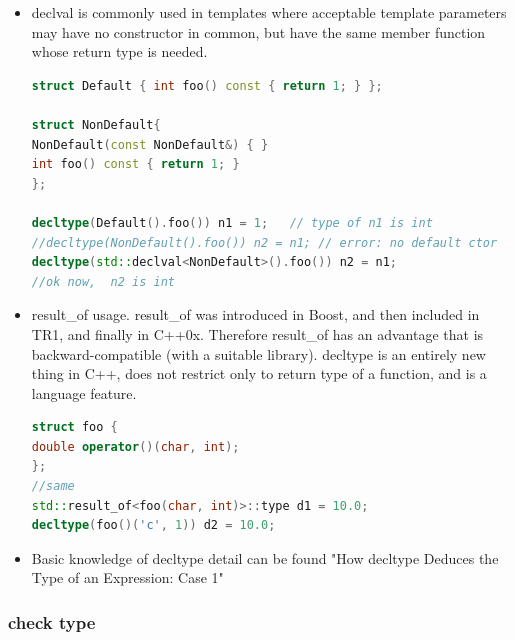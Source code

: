 \documentclass[a4paper,12pt,twoside]{book}
\begin{document}
\begin{itemize}
	\item declval is commonly used in templates where acceptable template parameters may have no constructor in common, but have the same member function whose return type is needed.
	
\begin{lstlisting}[frame=single, language=c++]
struct Default { int foo() const { return 1; } };

struct NonDefault{
NonDefault(const NonDefault&) { }
int foo() const { return 1; }
};
	
decltype(Default().foo()) n1 = 1;   // type of n1 is int
//decltype(NonDefault().foo()) n2 = n1; // error: no default ctor
decltype(std::declval<NonDefault>().foo()) n2 = n1;
//ok now,  n2 is int
\end{lstlisting}
	
	\item result\_of usage. result\_of was introduced in Boost, and then included in TR1, and finally in C++0x. Therefore result\_of has an advantage that is backward-compatible (with a suitable library). decltype is an entirely new thing in C++, does not restrict only to return type of a function, and is a language feature.
\begin{lstlisting}[frame=single, language=c++]
struct foo {
double operator()(char, int);
};
//same
std::result_of<foo(char, int)>::type d1 = 10.0;
decltype(foo()('c', 1)) d2 = 10.0;
\end{lstlisting}

\item Basic knowledge of decltype detail can be found "How decltype Deduces the Type of an Expression: Case 1"
\end{itemize}

\subsubsection{check type}
\end{document}
